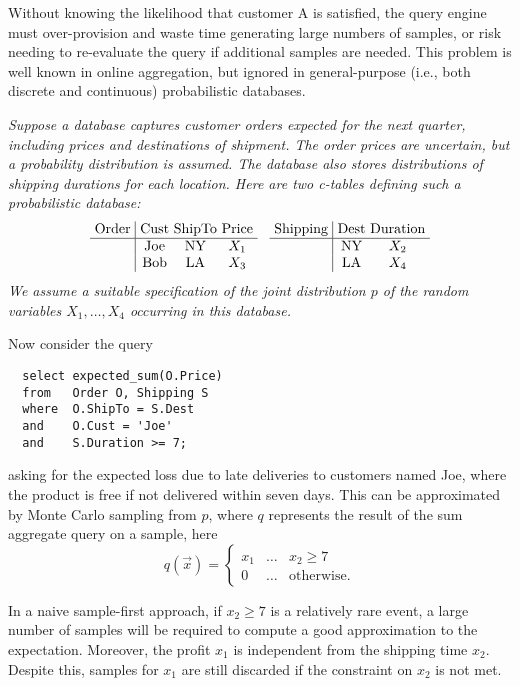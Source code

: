 Without knowing the likelihood that customer A is satisfied, the query engine must over-provision and waste time generating large numbers of samples, or risk needing to re-evaluate the query if additional samples are needed.  This problem is well known in online aggregation, but ignored in general-purpose (i.e., both discrete and continuous) probabilistic databases.  


\begin{example}\em
\label{ex:intro}
Suppose a database captures customer orders expected for the next quarter,
including prices
and destinations of shipment. The order prices are 
uncertain, but a probability distribution is assumed.
The database also stores
distributions of shipping durations for each location.
Here are two c-tables defining such a probabilistic database:
\[
\begin{tabular}{@{~}c@{~}|@{~}c@{~}c@{~}c@{~}}
Order & Cust & ShipTo & Price \\
\hline
& Joe & NY & $X_1$ \\
& Bob & LA & $X_3$ \\
\end{tabular}
\hspace{3mm}
\begin{tabular}{@{~}c@{~}|@{~}c@{~}c@{~}}
Shipping & Dest & Duration \\
\hline
& NY & $X_2$ \\
& LA & $X_4$ \\
\end{tabular}
\]
We assume a suitable specification of the joint distribution $p$ of the random
variables $X_1,\dots,X_4$ occurring in this database.

Now consider the query
{\small\begin{verbatim}
  select expected_sum(O.Price)
  from   Order O, Shipping S
  where  O.ShipTo = S.Dest
  and    O.Cust = 'Joe'
  and    S.Duration >= 7;
\end{verbatim}}
\noindent asking for the expected loss due to late deliveries to customers named Joe,
where the product is free if not delivered within seven days.
%
This can be approximated by Monte Carlo sampling from $p$,
where $q$ represents the result of the sum aggregate query on a sample,
here
\[
q(\vec{x}) =
\left\{
\begin{array}{lll}
x_1 & \dots & x_2 \ge 7 \\
0 & \dots & \mbox{otherwise.}
\end{array}
\right.
\]

In a naive sample-first approach, 
if $x_2 \ge 7$ is a relatively rare event, a large number of samples will be
required to compute a good approximation to the expectation.
Moreover, the profit $x_1$ is independent from the shipping time $x_2$.  Despite this, samples for $x_1$ are still discarded if the constraint on $x_2$ is not met.

\end{example}

